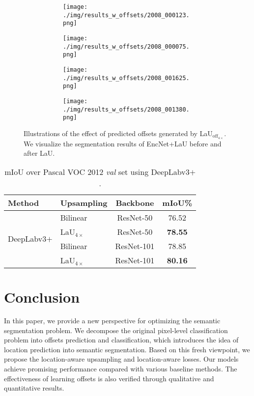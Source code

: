 \documentclass[10pt,twocolumn,letterpaper]{article}
\begin{document}
\begin{figure}[t]
\begin{subfigure}[t]{0.11\textwidth}
\begin{subfigure}[t]{\textwidth}
                \texttt{[image: ./img/results\_w\_offsets/2008\_000123.png]}
            \end{subfigure}\vspace{.1ex}

\begin{subfigure}[t]{\textwidth}
                \texttt{[image: ./img/results\_w\_offsets/2008\_000075.png]}
            \end{subfigure}\vspace{.1ex}

\begin{subfigure}[t]{\textwidth}
                \texttt{[image: ./img/results\_w\_offsets/2008\_001625.png]}
            \end{subfigure}\vspace{.1ex}

            \begin{subfigure}[t]{\textwidth}
                \texttt{[image: ./img/results\_w\_offsets/2008\_001380.png]}
        \label{6d}
            \end{subfigure}
    \end{subfigure}
        \caption{Illustrations of the effect of predicted offsets generated by LaU$_{\text{off}_{4\times}}$. We visualize the segmentation results of EncNet+LaU before and after LaU.}
\label{view2}
\end{figure}


\begin{table}
  \caption{mIoU over Pascal VOC 2012 \textit{val} set using DeepLabv3$+$ \cite{deeplabv3}.}
  \label{sample-table}
  \centering
\begin{tabular}{llcc}
\hline    
Method    & Upsampling & Backbone   & mIoU\%\\
\hline  \hline  
    \multirow{4}{*}{DeepLabv3$+$}  & Bilinear & ResNet-50  & 76.52 \\
    & LaU$_{4\times}$ & ResNet-50 & \textbf{78.55} \\
    & Bilinear & ResNet-101  & 78.85 \\ 
   & LaU$_{4\times}$ & ResNet-101 & \textbf{80.16} \\ 
\hline
\end{tabular}
\label{deeplab}
\end{table}

\section{Conclusion}
In this paper, we provide a new perspective for optimizing the semantic segmentation problem. We decompose the original pixel-level classification problem into offsets prediction and classification, which introduces the idea of location prediction into semantic segmentation. Based on this fresh viewpoint, we propose the location-aware upsampling and location-aware losses. Our models achieve promising performance compared with various baseline methods. The effectiveness of learning offsets is also verified through qualitative and quantitative results.
\end{document}
